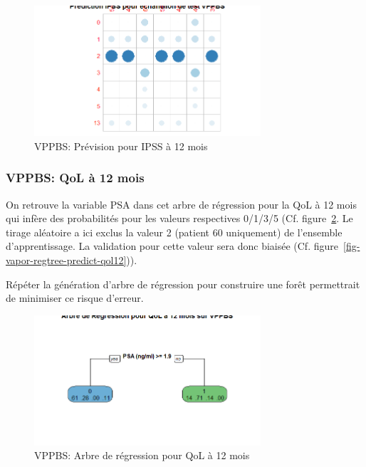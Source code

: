 \begin{figure}[H]
\centering
\includegraphics[width=0.75\textwidth]{../Fig/VPPBS/vppbs-regtree-predict-ipss12.png}
\caption{VPPBS: Prévision pour IPSS à 12 mois}
\label{fig-vppbs-regtree-predict-ipss12}
\end{figure}

\subsubsection{VPPBS: QoL à 12 mois}

On retrouve la variable PSA dans cet arbre de régression pour la QoL à 12 mois
qui infère des probabilités pour les valeurs respectives 0/1/3/5 (Cf. figure~\ref{fig-vppbs-regtree-qol12}. Le tirage aléatoire a ici exclus la valeur 2
(patient 60 uniquement) de l'ensemble d'apprentissage. La validation pour cette
valeur sera donc biaisée (Cf. figure~\ref{fig-vapor-regtree-predict-qol12})).

Répéter la génération d'arbre de régression pour construire une forêt permettrait de
minimiser ce risque d'erreur. 

\begin{figure}[H]
\centering
\includegraphics[width=0.75\textwidth]{../Fig/VPPBS/vppbs-regtree-qol12.png}
\caption{VPPBS: Arbre de régression pour QoL à 12 mois}
\label{fig-vppbs-regtree-qol12}
\end{figure}


